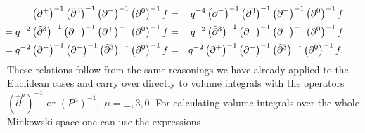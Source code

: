 \documentclass[a4paper,11pt,oneside]{article}
\begin{document}
\begin{eqnarray}
\hspace*{-0.7cm}\left( \partial ^{+}\right) ^{-1}\left( \tilde{\partial}%
^{3}\right) ^{-1}\left( \partial ^{-}\right) ^{-1}\left( \partial
^{0}\right) ^{-1}f &=&q^{-4}\left( \partial ^{-}\right) ^{-1}\left( \tilde{%
\partial}^{3}\right) ^{-1}\left( \partial ^{+}\right) ^{-1}\left( \partial
^{0}\right) ^{-1}f \\
\hspace*{-0.7cm}=q^{-2}\left( \tilde{\partial}^{3}\right) ^{-1}\left(
\partial ^{-}\right) ^{-1}\left( \partial ^{+}\right) ^{-1}\left( \partial
^{0}\right) ^{-1}f &=&q^{-2}\left( \tilde{\partial}^{3}\right) ^{-1}\left(
\partial ^{+}\right) ^{-1}\left( \partial ^{-}\right) ^{-1}\left( \partial
^{0}\right) ^{-1}f  \nonumber \\
\hspace*{-0.7cm}=q^{-2}\left( \partial ^{-}\right) ^{-1}\left( \partial
^{+}\right) ^{-1}\left( \tilde{\partial}^{3}\right) ^{-1}\left( \partial
^{0}\right) ^{-1}f &=&q^{-2}\left( \partial ^{+}\right) ^{-1}\left( \partial
^{-}\right) ^{-1}\left( \tilde{\partial}^{3}\right) ^{-1}\left( \partial
^{0}\right) ^{-1}f.  \nonumber
\end{eqnarray}
These relations follow from the same reasonings we have already applied to the
Euclidean cases and carry over directly to volume integrals with the
operators $\left( \hat{\partial}^{\mu}\right) ^{-1}$ or $\left( P^{\mu}\right)
^{-1},$ $\mu=\pm ,\tilde{3},0.$
For calculating volume integrals over the whole Minkowski-space one
can use the
expressions 
\end{document}
